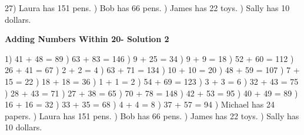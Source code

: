 \documentclass{article}%
\begin{document}
27) Laura has 151 pens.%
) Bob has 66 pens.%
) James has 22 toys.%
) Sally has 10 dollars.%
\newline%
\newpage%
\large%
\begin{center}%
\textbf{Adding Numbers Within 20- Solution 2}%
\newline%
\end{center} \normalsize%
1) 41 + 48 = 89%
) 63 + 83 = 146%
) 9 + 25 = 34%
) 9 + 9 = 18%
) 52 + 60 = 112%
) 26 + 41 = 67%
) 2 + 2 = 4%
) 63 + 71 = 134%
) 10 + 10 = 20%
) 48 + 59 = 107%
) 7 + 15 = 22%
) 18 + 18 = 36%
) 1 + 1 = 2%
) 54 + 69 = 123%
) 3 + 3 = 6%
) 32 + 43 = 75%
) 28 + 43 = 71%
) 27 + 38 = 65%
) 70 + 78 = 148%
) 42 + 53 = 95%
) 40 + 49 = 89%
) 16 + 16 = 32%
) 33 + 35 = 68%
) 4 + 4 = 8%
) 37 + 57 = 94%
) Michael has 24 papers.%
) Laura has 151 pens.%
) Bob has 66 pens.%
) James has 22 toys.%
) Sally has 10 dollars.%
\newline%
\newpage%
\end{document}
